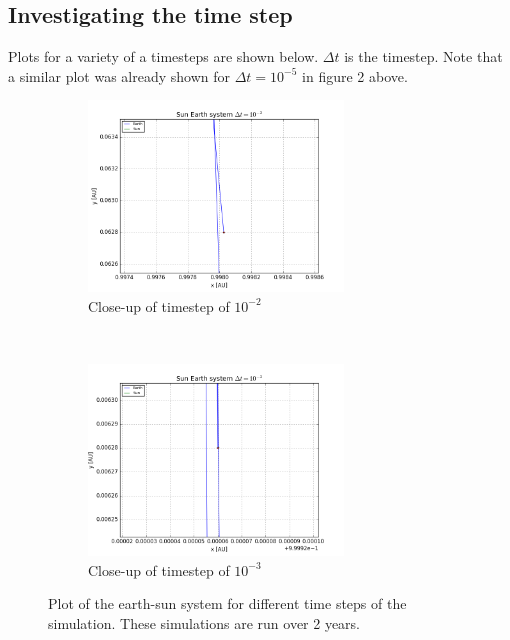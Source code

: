 \documentclass[a4paper, 10pt]{article}
\begin{document}
\subsection{Investigating the time step}
Plots for a variety of a timesteps are shown below. $\Delta t$ is the timestep. Note that a similar plot was already shown for $\Delta t = 10^{-5}$ in figure 2 above. 
\begin{figure}[t!]
    \centering
    \begin{subfigure}[t]{0.5\textwidth}
        \centering
        \includegraphics[height=2.0in]{orbitESe2y2png.png}
        \caption{Close-up of timestep of $10^{-2}$}
    \end{subfigure}%
    ~ 
    \begin{subfigure}[t]{0.5\textwidth}
        \centering
        \includegraphics[height=2.0in]{orbitESe3y2png.png}
        \caption{Close-up of timestep of $10^{-3}$}
    \end{subfigure}
    \caption{Plot of the earth-sun system for different time steps of the simulation. These simulations are run over 2 years.}\label{fig:timestep}
\end{figure}
\end{document}
